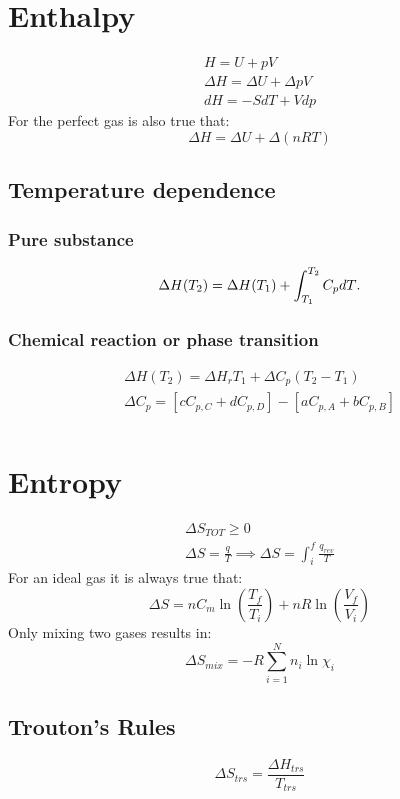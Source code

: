 \documentclass[a4paper]{report}
\begin{document}
\begin{multicols}{2}
    \section{Enthalpy}
          \begin{gather*}
          H = U + pV\\
          \Delta H = \Delta U + \Delta pV \\
          dH = -SdT + Vdp
          \end{gather*}  
          For the perfect gas is also true that:
          \[
            \Delta H = \Delta U + \Delta (nRT)
          \]

      \subsection{Temperature dependence}
      \subsubsection{Pure substance}
      \[
        \Delta H(T_2) = \Delta H(T_1) + \int _{T_1} ^{T_2} C_{p}dT\\
      .\] 
    \subsubsection{Chemical reaction or phase transition}
    \begin{gather*}
        \Delta H(T_2) = \Delta H_{r}T_1 + \Delta C_{p}(T_2 - T_1)\\
        \Delta C_{p} = [c C_{p,C} + d C_{p,D}] - [a C_{p,A} + b C_{p,B}] \\
    \end{gather*}

    \section{Entropy} 

    \begin{gather*}
       \Delta S_{TOT} \geq 0 \\  
       \Delta S  = \frac{q}{T} \implies \Delta S = \int _{i} ^{f} \frac{q_{rev}}{T}
     \end{gather*} 
    For an ideal gas it is always true that:
    \[
      \Delta S = nC_{m}\ln \left( \frac{T_{f}}{T_{i} }  \right) + nR\ln \left( \frac{V_{f}}{V_{i} }  \right)  
    \]
    Only mixing two gases results in:
    \[
      \Delta S_{mix} = -R \sum_{i=1}^{N} n_{i}\ln \chi _{i}   
    \]      
    \subsection{Trouton's Rules }
    \[
     \Delta S_{trs} = \frac{\Delta H _{trs} }{T_{trs} }
    \] 
    



\end{multicols}
\end{document}
